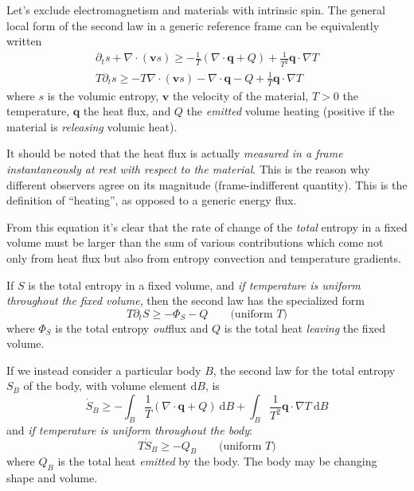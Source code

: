 \documentclass[\ifafour a4paper,12pt,\else a5paper,10pt,\fi%
onecolumn,oneside,article,%
british%
]{memoir}
\theoremstyle{remark}
\theoremstyle{innote}
\newcommand*{\de}{\partialup}%
\newcommand*{\di}{\mathrm{d}}%
\renewcommand*{\ge}{\geqslant}%
\renewcommand*{\|}[1][]{\nonscript\,#1\vert\nonscript\;\mathopen{}}
\newcommand*{\yv}{\bm{v}}
\newcommand*{\yq}{\bm{q}}
\begin{document}
Let's exclude electromagnetism and materials with intrinsic spin. The general
local form of the second law in a generic reference frame can be
equivalently written
\begin{equation}
  \label{eq:2nd_law_local}
  \begin{gathered}
  \de_{t}s + \nabla\cdot(\yv s) \ge
  -\frac{1}{T}(\nabla\cdot\yq  + Q) +\frac{1}{T^{2}}\yq\cdot\nabla T
  \\
  T\de_{t}s \ge - T\nabla\cdot(\yv s) 
  -\nabla\cdot\yq  - Q +\frac{1}{T}\yq\cdot\nabla T
\end{gathered}
\end{equation}
where $s$ is the volumic entropy, $\yv$ the velocity of the material, $T>0$
the temperature, $\yq$ the heat flux, and $Q$ the \emph{emitted} volume
heating (positive if the material is \emph{releasing} volumic heat).

It should be noted that the heat flux is actually \emph{measured in a frame
  instantaneously at rest with respect to the material}. This is the reason
why different observers agree on its magnitude (frame-indifferent
quantity). This is the definition of \enquote{heating}, as opposed to a
generic energy flux.

From this equation it's clear that the rate of change of the \emph{total}
entropy in a fixed volume must be larger than the sum of various
contributions which come not only from heat flux but also from entropy
convection and temperature gradients.

If $S$ is the total entropy in a fixed volume, and \emph{if temperature is
  uniform throughout the fixed volume}, then the second law has the
specialized form
\begin{equation}
  \label{eq:2nd_law_volume_unifT}
  T\de_{t}S \ge -\varPhi_{S} - Q \qquad\text{(uniform $T$)}
\end{equation}
where $\varPhi_{S}$ is the total entropy \emph{out}flux and $Q$ is the total heat
\emph{leaving} the fixed volume.

\medskip

If we instead consider a particular body $B$, the second law for the total
entropy $S_{B}$ of the body, with volume element $\di B$, is
\begin{equation}
  \label{eq:2nd_law_body}
  \Dot{S}_{B} \ge
  -\int_{B}\frac{1}{T}(\nabla\cdot\yq  + Q)\ \di B
  + \int_{B} \frac{1}{T^{2}}\yq\cdot\nabla T \ \di B
\end{equation}
and \emph{if temperature is uniform throughout the body}:
\begin{equation}
  \label{eq:2nd_law_body_unifT}
  T\Dot{S}_{B} \ge  - Q_{B} \qquad\text{(uniform $T$)}
\end{equation}
where $Q_{B}$ is the total heat \emph{emitted} by the body. The body may be
changing shape and volume.
\end{document}

